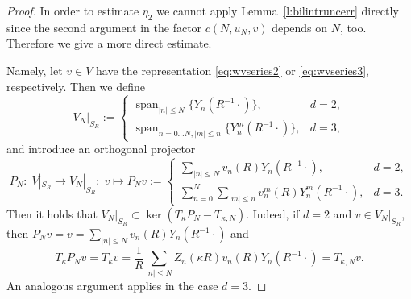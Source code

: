 \documentclass[12pt,DIV=14]{scrartcl}
\providecommand{\spann}{\operatorname{span}}
\begin{document}
\begin{proof}
In order to estimate $\eta_2$ we cannot apply Lemma~\ref{l:bilintruncerr} directly
since the second argument in the factor $c(N,u_N,v)$ depends on $N$, too.
Therefore we give a more direct estimate.

Namely, let $v\in V$ have the representation \eqref{eq:wvseries2} or \eqref{eq:wvseries3}, respectively.
Then we define
\[
V_N|_{S_R} := \begin{cases}
\spann_{|n|\le N}\{Y_n(R^{-1}\cdot)\},& d=2,\\
\spann_{n=0\ldots N,|m|\le n}\{Y_n^m(R^{-1}\cdot)\},& d=3,
\end{cases}
\]
and introduce an orthogonal projector
\[
P_N:\;V|_{S_R}\to V_N|_{S_R}:\; v\mapsto P_Nv := \begin{cases}
\sum_{|n|\le N} v_n(R)Y_n(R^{-1}\cdot),
& d=2,\\
\sum_{n=0}^N\sum_{|m|\le n} v_n^m(R)Y_n^m(R^{-1}\cdot),
& d=3.
\end{cases}
\]
Then it holds that $V_N|_{S_R}\subset\ker (T_\kappa P_N - T_{\kappa,N})$.
Indeed, if $d=2$ and $v\in V_N|_{S_R}$, then
$P_Nv = v = \sum_{|n|\le N} v_n(R)Y_n(R^{-1}\cdot)$ and
\[
T_\kappa P_Nv = T_\kappa v
= \frac{1}{R}\sum_{|n|\le N} Z_n(\kappa R)v_n(R)Y_n(R^{-1}\cdot)
= T_{\kappa,N} v.
\]
An analogous argument applies in the case $d=3$.


\end{proof}
\end{document}
